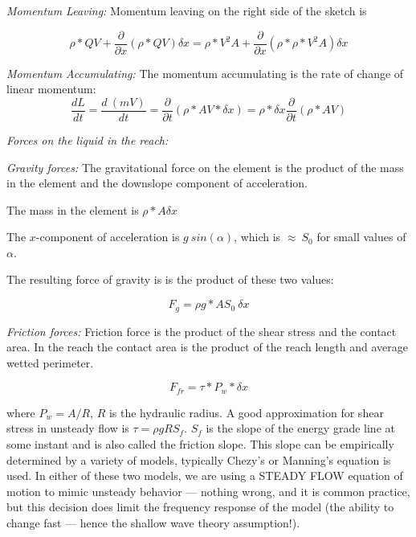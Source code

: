 \textsl{Momentum Leaving:} 
Momentum leaving on the right side of the sketch is 

\begin{equation}
\rho*QV+\frac{\partial}{\partial x}(\rho*QV)\delta x = \rho*V^2A+\frac{\partial}{\partial x}(\rho*\rho*V^2A)\delta x
\end{equation}

\textsl{Momentum Accumulating:}
The momentum accumulating is the rate of change of linear momentum:
\begin{equation}
\frac{dL}{dt}= \frac{d~(mV)}{dt}=\frac{\partial}{\partial t}(\rho*AV*\delta x)=\rho*\delta x\frac{\partial}{\partial t}(\rho*AV)
\end{equation}


\textsl{Forces on the liquid in the reach:}

\textsl{Gravity forces:}  The gravitational force on the element is the product of the mass in the element and the downslope component of acceleration.

The mass in the element is $\rho*A\delta x$ 

The $x$-component of acceleration is $g~sin(\alpha)$, which is $\approx~S_0$ for small values of $\alpha$.

The resulting force of gravity is is the product of these two values:

\begin{equation}
F_g=\rho g *AS_0~\delta x
\end{equation}



\textsl{Friction forces:}   Friction force is the product of the shear stress and the contact area.  In the reach the contact area is the product of the reach length and average wetted perimeter.  

\begin{equation}
F_{fr} = \tau * P_w * \delta x
\end{equation}

where $P_w = A/R$, $R$ is the hydraulic radius.  A good approximation for shear stress in unsteady flow is $\tau = \rho g R S_f$.  $S_f$ is the slope of the energy grade line at some instant and is also called the friction slope.  This slope can be empirically determined by a variety of models, typically Chezy's or Manning's equation is used.  In either of these two models, we are using a STEADY FLOW equation of motion to mimic unsteady behavior --- nothing wrong, and it is common practice, but this decision does limit the frequency response of the model (the ability to change fast --- hence the shallow wave theory assumption!).

